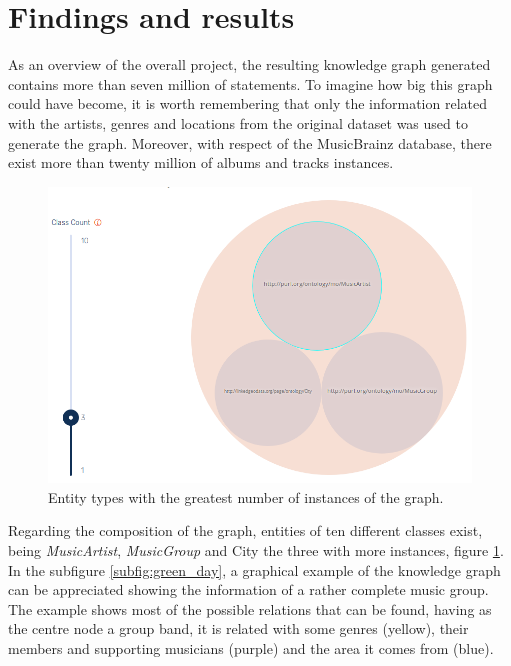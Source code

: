 \section{Findings and results}
As an overview of the overall project, the resulting knowledge graph generated contains more than seven million of statements.
To imagine how big this graph could have become, it is worth remembering that only the information related with the artists, genres and locations from the original dataset was used to generate the graph.
Moreover, with respect of the MusicBrainz database, there exist more than twenty million of albums and tracks instances.

\begin{figure}[!tbh]
\centering
\includegraphics[width=0.8\linewidth]{images/classes}
\caption{Entity types with the greatest number of instances of the graph.}
\label{fig:classes}
\end{figure} 

Regarding the composition of the graph, entities of ten different classes exist, being \textit{MusicArtist}, \textit{MusicGroup} and City the three with more instances, figure \ref{fig:classes}. In the subfigure \ref{subfig:green_day}, a graphical example of the knowledge graph can be appreciated showing the information of a rather complete music group. The example shows most of the possible relations that can be found, having as the centre node a group band, it is related with some genres (yellow), their members and supporting musicians (purple) and the area it comes from (blue).

